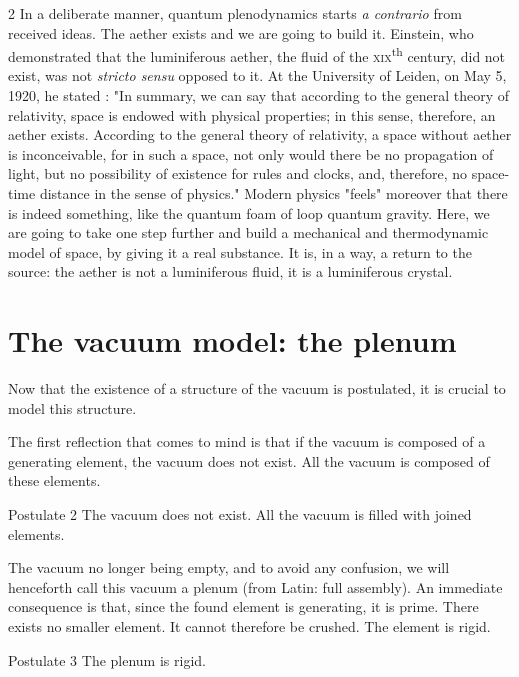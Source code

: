 \begin{multicols}{2}
	In a deliberate manner, quantum plenodynamics starts \textit{a contrario} from 
	received ideas. The aether exists and we are going to build it. Einstein, who 
	demonstrated that the luminiferous aether, the fluid of the \textsc{xix}\textsuperscript{th} century, did not exist, 
	was not \textit{stricto sensu} opposed to it. At the University of 
	Leiden, on May 5, 1920, he stated \cite{einstein1920ether}: "In 
	summary, we can say that according to the general theory of 
	relativity, space is endowed with physical properties; in this sense, 
	therefore, an aether exists. According to the general theory of 
	relativity, a space without aether is inconceivable, for in such a 
	space, not only would there be no propagation of light, 
	but no possibility of existence for rules and clocks, 
	and, therefore, no space-time distance in the sense of 
	physics." Modern physics "feels" moreover that there is indeed 
	something, like the quantum foam of loop quantum 
	gravity. Here, we are going to take one step further and build a 
	mechanical and thermodynamic model of space, by giving it a real 
	substance. It is, in a way, a return to the source: the aether is 
	not a luminiferous fluid, it is a luminiferous crystal.
	
	
	\section{The vacuum model: the plenum}
	
	Now that the existence of a structure of the vacuum is postulated, it is 
	crucial to model this structure.
	
	The first reflection that comes to mind is that if the vacuum is 
	composed of a generating element, the vacuum does not exist. All the vacuum 
	is composed of these elements.
	
	\begin{mybox}[breakable,colback=blue!10, colbacktitle=pkcolor]{Postulate 2}
		The vacuum does not exist. All the vacuum is filled with joined elements.
	\end{mybox}
	\medskip
	
	The vacuum no longer being empty, and to avoid any confusion, we 
	will henceforth call this vacuum a plenum (from Latin: full assembly). 
	An immediate consequence is that, since the found element is 
	generating, it is prime. There exists no smaller element. It 
	cannot therefore be crushed. The element is rigid.
	
	\begin{mybox}[breakable,colback=blue!10, colbacktitle=pkcolor]{Postulate 3}
		The plenum is rigid.
	\end{mybox}
	\medskip
	

\end{multicols}
